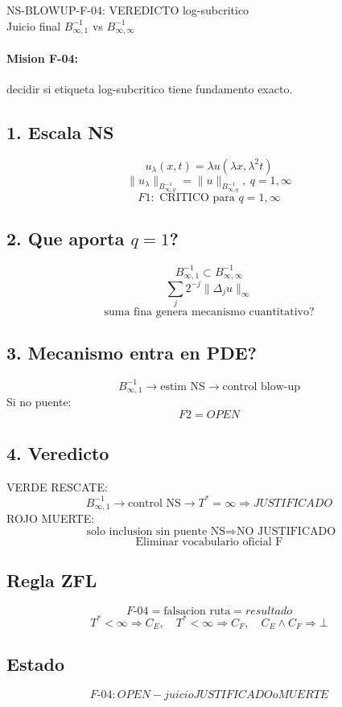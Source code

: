 \documentclass[11pt]{article}
\begin{document}
\begin{center}
{\Large NS-BLOWUP-F-04: VEREDICTO log-subcritico}\\
Juicio final $B^{-1}_{\infty,1}$ vs $B^{-1}_{\infty,\infty}$
\end{center}

\paragraph{Mision F-04:} decidir si etiqueta log-subcritico tiene fundamento exacto.

\subsection*{1. Escala NS}
\[
u_\lambda(x,t)=\lambda u(\lambda x,\lambda^2 t)
\]
\[
\boxed{\|u_\lambda\|_{B^{-1}_{\infty,q}}=\|u\|_{B^{-1}_{\infty,q}},\ q=1,\infty}
\]
\[
\boxed{F1:\text{ CRITICO para }q=1,\infty}
\]

\subsection*{2. Que aporta $q=1$?}
\[
\boxed{B^{-1}_{\infty,1}\subset B^{-1}_{\infty,\infty}}
\]
\[
\sum_j 2^{-j}\|\Delta_j u\|_\infty
\]
\[
\boxed{\text{suma fina genera mecanismo cuantitativo?}}
\]

\subsection*{3. Mecanismo entra en PDE?}
\[
\boxed{B^{-1}_{\infty,1}\to\text{estim NS}\to\text{control blow-up}}
\]
Si no puente:
\[
\boxed{F2=OPEN}
\]

\subsection*{4. Veredicto}
VERDE RESCATE:
\[
\boxed{B^{-1}_{\infty,1}\to\text{control NS}\to T^*=\infty\Rightarrow JUSTIFICADO}
\]
ROJO MUERTE:
\[
\boxed{\text{ solo inclusion sin puente NS}\Rightarrow\text{NO JUSTIFICADO}}
\]
\[
\boxed{\text{Eliminar vocabulario oficial F}}
\]

\subsection*{Regla ZFL}
\[
\boxed{F\text{-}04=\text{falsacion ruta}=resultado}
\]
\[
\boxed{T^*<\infty\Rightarrow C_E,\quad T^*<\infty\Rightarrow C_F,\quad C_E\land C_F\Rightarrow\bot}
\]

\subsection*{Estado}
\[
\boxed{F\text{-}04: OPEN - juicio JUSTIFICADO o MUERTE}
\]
\end{document}
